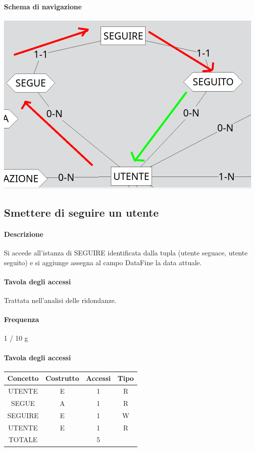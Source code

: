 \documentclass[a4paper,12pt]{report}
\begin{document}
\paragraph{Schema di navigazione\newline}
\includegraphics[scale=0.5]{./img/seguire.png}
\subsection{Smettere di seguire un utente} \label{unfollow}
\paragraph{Descrizione} Si accede all'istanza di SEGUIRE identificata dalla tupla (utente seguace, utente seguito) e si aggiunge assegna al campo DataFine la data attuale.
\paragraph{Tavola degli accessi}
Trattata nell'analisi delle ridondanze.

\paragraph{Frequenza} 1 / 10 g
\begin{table}[H]
\paragraph{Tavola degli accessi\newline}
\begin{tabular}{|c|c|c|c|}
\hline
Concetto & Costrutto & Accessi & Tipo \\ \hline
UTENTE   & E         & 1       & R    \\ \hline
SEGUE    & A         & 1       & R    \\ \hline
SEGUIRE  & E         & 1       & W    \\ \hline
UTENTE   & E         & 1       & R    \\ \hline
TOTALE   &           & 5       &      \\ \hline
\end{tabular}
\end{table}
\end{document}
